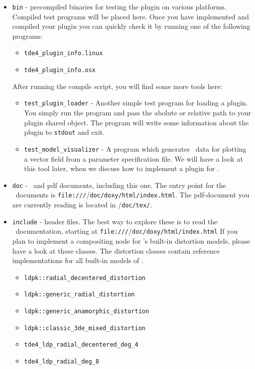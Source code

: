 \documentclass[10pt,a4paper]{article}
\begin{document}
\begin{itemize}
\item {\tt bin} - precompiled binaries for testing the plugin on various platforms.
Compiled test programs will be placed here.
Once you have implemented and compiled your plugin you can quickly check it by
running one of the following programs:
	\begin{itemize}
	\item {\tt tde4\_plugin\_info.linux}
	\item {\tt tde4\_plugin\_info.osx}
	\end{itemize}
After running the compile script, you will find some more tools here:
	\begin{itemize}
	\item {\tt test\_plugin\_loader} - Another simple test program for loading a plugin.
	You simply run the program and pass the abolute or relative
	path to your plugin shared object. The program will write
	some information about the plugin to {\tt stdout} and exit.
	\item {\tt test\_model\_visualizer} - A program which generates \gnuplot\
	data for plotting a vector field from a parameter specification file.
	We will have a look at this tool later, when we discuss how to implement
	a plugin for \tde.
	\end{itemize}	
\item {\tt doc} - \doxygen\ and pdf documents, including this one.
The entry point for the \doxygen\ documents is {\tt file:///}\ldpk/{\tt doc/doxy/html/index.html}.
The pdf-document you are currently reading is located in \ldpk/{\tt doc/tex/}.
\item {\tt include} - header files. The best way to explore these is to read the
\doxygen\ documentation, starting at {\tt file:///}\ldpk/{\tt doc/doxy/html/index.html}
If you plan to implement a compositing node for \tde's built-in distortion models,
please have a look at these classes. The distortion classes contain reference implementations
for all built-in models of \tde.
\begin{itemize}
\item {\tt ldpk::radial\_decentered\_distortion}
\item {\tt ldpk::generic\_radial\_distortion}
\item {\tt ldpk::generic\_anamorphic\_distortion}
\item {\tt ldpk::classic\_3de\_mixed\_distortion}
\item {\tt tde4\_ldp\_radial\_decentered\_deg\_4}
\item {\tt tde4\_ldp\_radial\_deg\_8}

\end{itemize}
\end{itemize}
\end{document}
